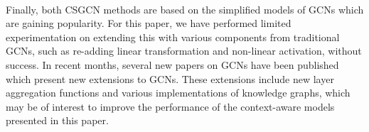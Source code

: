 \\
Finally, both CSGCN methods are based on the simplified models of GCNs which are gaining popularity.
For this paper, we have performed limited experimentation on extending this with various components from traditional GCNs, such as re-adding linear transformation and non-linear activation, without success.
In recent months, several new papers on GCNs have been published which present new extensions to GCNs.
These extensions include new layer aggregation functions and various implementations of knowledge graphs, which may be of interest to improve the performance of the context-aware models presented in this paper.
